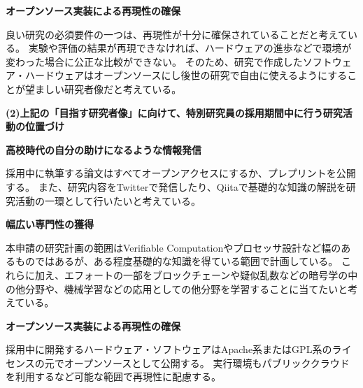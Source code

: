 \noindent\textbf{オープンソース実装による再現性の確保}

良い研究の必須要件の一つは、再現性が十分に確保されていることだと考えている。
実験や評価の結果が再現できなければ、ハードウェアの進歩などで環境が変わった場合に公正な比較ができない。
そのため、研究で作成したソフトウェア・ハードウェアはオープンソースにし後世の研究で自由に使えるようにすることが望ましい研究者像だと考えている。



\vspace{5mm}
\noindent
\textbf{(2)上記の「目指す研究者像」に向けて、特別研究員の採用期間中に行う研究活動の位置づけ}

\noindent\textbf{ 高校時代の自分の助けになるような情報発信}

採用中に執筆する論文はすべてオープンアクセスにするか、プレプリントを公開する。
また、研究内容をTwitterで発信したり、Qiitaで基礎的な知識の解説を研究活動の一環として行いたいと考えている。

\noindent\textbf{ 幅広い専門性の獲得}

本申請の研究計画の範囲はVerifiable Computationやプロセッサ設計など幅のあるものではあるが、ある程度基礎的な知識を得ている範囲で計画している。
これらに加え、エフォートの一部をブロックチェーンや疑似乱数などの暗号学の中の他分野や、機械学習などの応用としての他分野を学習することに当てたいと考えている。

\noindent\textbf{ オープンソース実装による再現性の確保}

採用中に開発するハードウェア・ソフトウェアはApache系またはGPL系のライセンスの元でオープンソースとして公開する。
実行環境もパブリッククラウドを利用するなど可能な範囲で再現性に配慮する。







